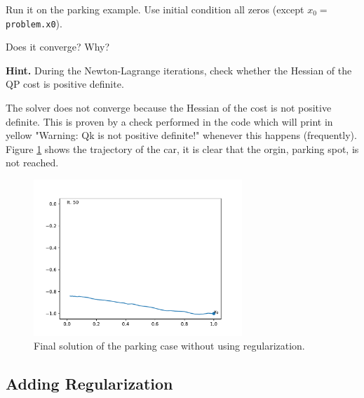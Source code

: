 \documentclass[]{article}
\begin{document}
\begin{assignment}
   Run it on the parking example. Use initial condition all zeros (except $x_0 = $\texttt{problem.x0}).
   
	Does it converge? Why? 
	
	\textbf{Hint. } During the Newton-Lagrange iterations, check whether the Hessian of the QP cost is positive definite.
\end{assignment}
\begin{flushleft}
	The solver does not converge because the Hessian of the cost is not positive definite. 
	This is proven by a check performed in the code which will print in yellow "Warning: Qk is not positive definite!" whenever this happens (frequently).
	Figure \ref{fig:assignment64-parking} shows the trajectory of the car, it is clear that the orgin, parking spot, is not reached.
\end{flushleft}
\begin{figure}[H]
	\centering
	\includegraphics[width=0.7\textwidth]{images/parking_regularize-False-maxiter50.pdf}
	\caption{Final solution of the parking case without using regularization.}
	\label{fig:assignment64-parking}
\end{figure}

\subsection{Adding Regularization}
\end{document}
